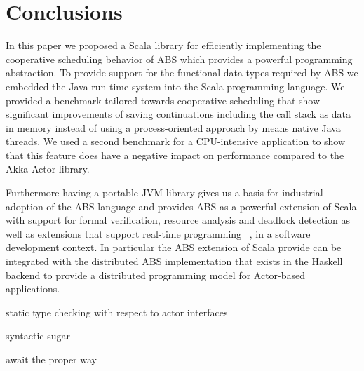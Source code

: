 \section{Conclusions}
\label{conc}
In this paper we proposed a Scala library for efficiently implementing the cooperative scheduling behavior of ABS which provides a powerful programming abstraction. 
To provide support for the functional data types required by ABS we embedded the Java run-time system into the Scala programming language. 
We provided a benchmark tailored towards cooperative scheduling that show significant improvements of saving continuations including the call stack as data in memory instead of using a process-oriented approach by means native Java threads. 
We used a second benchmark for a CPU-intensive application to show that this feature does have a negative impact on performance compared to the Akka Actor library.

\par Furthermore having a portable JVM library gives us a basis for industrial adoption of the ABS language and provides ABS as a powerful extension of Scala with support for formal verification, resource analysis and deadlock detection as well as extensions that support real-time programming ~\cite{rabs}, in a software development context. In particular the ABS extension of Scala provide can be integrated with the distributed ABS implementation that exists in the Haskell backend \cite{cloud} to provide a distributed programming model for Actor-based applications.

static type checking with respect to actor interfaces

syntactic sugar 

await the proper way





